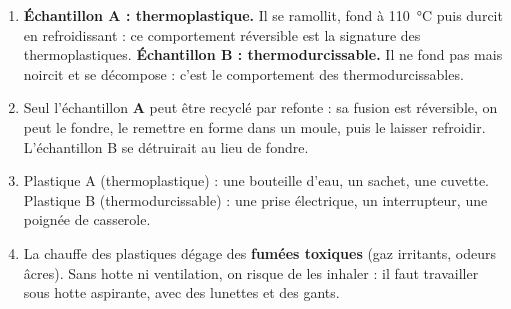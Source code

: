 \documentclass[11pt]{article}
\begin{document}
\begin{corrige}
\begin{enumerate}
\item \textbf{Échantillon A : thermoplastique.} Il se ramollit, fond à \SI{110}{\celsius} puis durcit en refroidissant : ce comportement réversible est la signature des thermoplastiques. \textbf{Échantillon B : thermodurcissable.} Il ne fond pas mais noircit et se décompose : c'est le comportement des thermodurcissables.
\item Seul l'échantillon \textbf{A} peut être recyclé par refonte : sa fusion est réversible, on peut le fondre, le remettre en forme dans un moule, puis le laisser refroidir. L'échantillon B se détruirait au lieu de fondre.
\item Plastique A (thermoplastique) : une bouteille d'eau, un sachet, une cuvette. Plastique B (thermodurcissable) : une prise électrique, un interrupteur, une poignée de casserole.
\item La chauffe des plastiques dégage des \textbf{fumées toxiques} (gaz irritants, odeurs âcres). Sans hotte ni ventilation, on risque de les inhaler : il faut travailler sous hotte aspirante, avec des lunettes et des gants.
\end{enumerate}
\end{corrige}
\end{document}
